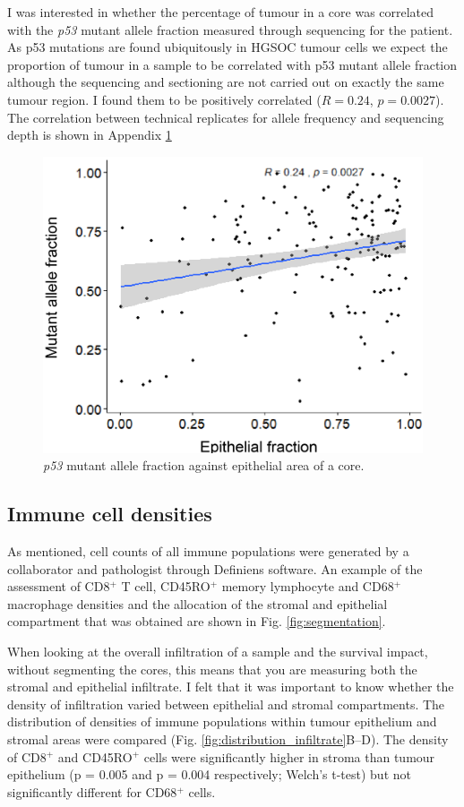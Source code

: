 I was interested in whether the percentage of tumour in a core was correlated with the \textit{p53} mutant allele fraction measured through sequencing for the patient. As p53 mutations are found ubiquitously in HGSOC tumour cells we expect the proportion of tumour in a sample to be correlated with p53 mutant allele fraction although the sequencing and sectioning are not carried out on exactly the same tumour region. I found them to be positively correlated ($R= 0.24$, $p=0.0027$). The correlation between technical replicates for allele frequency and sequencing depth is shown in Appendix \ref{fig:p53_allele}


\begin{figure}
    \centering
    \includegraphics{Chapter2/Figs/Raster/Thesis-05.png}
    \caption{\textit{p53} mutant allele fraction against epithelial area of a core.}
    \label{fig:p53_allele}
\end{figure}

\subsection{Immune cell densities}


As mentioned, cell counts of all immune populations were generated by a collaborator and pathologist through Definiens software. An example of the assessment of CD8$^+$ T cell, CD45RO$^+$ memory lymphocyte and CD68$^+$ macrophage densities and the allocation of the stromal and epithelial compartment that was obtained are shown in Fig. \ref{fig:segmentation}.

When looking at the overall infiltration of a sample and the survival impact, without segmenting the cores, this means that you are measuring both the stromal and epithelial infiltrate. I felt that it was important to know whether the density of infiltration varied between epithelial and stromal compartments. The distribution of densities of immune populations within tumour epithelium and stromal areas were compared (Fig. \ref{fig:distribution_infiltrate}B–D). The density of CD8$^+$ and CD45RO$^+$ cells were significantly higher in stroma than tumour epithelium (p = 0.005 and p = 0.004 respectively; Welch’s t-test) but not significantly different for CD68$^+$ cells. 

